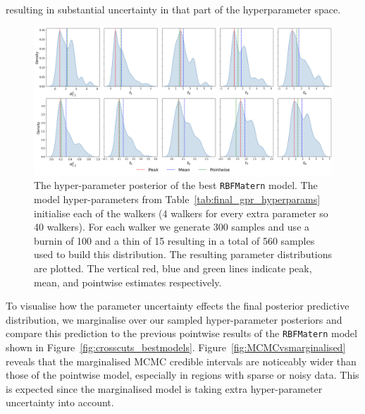 \documentclass{ucdgradtaughtthesis}
\begin{document}
resulting in substantial uncertainty in that part of the hyperparameter space.
\begin{figure}[H]
    \centering
    \includegraphics[width=1\textwidth]{LatexPlots/final_gps_plots/MCMCRBFMat.png}
    \caption[The hyper-parameter posterior of the best \texttt{RBFMatern} model.]{The hyper-parameter posterior of the best \texttt{RBFMatern} model. The model hyper-parameters from Table~\ref{tab:final_gpr_hyperparams} initialise each of the walkers (4 walkers for every extra parameter so 40 walkers). For each walker we generate 300 samples and use a burnin of 100 and a thin of 15 resulting in a total of 560 samples used to build this distribution.
    The resulting parameter distributions are plotted. The vertical red, blue and green lines indicate peak, mean, and pointwise estimates respectively.}
    \label{fig:MCMCRBFMatern}
\end{figure}
To visualise how the parameter uncertainty effects the final posterior predictive distribution, we marginalise over our sampled hyper-parameter posteriors and compare this prediction to the previous pointwise results of the \texttt{RBFMatern} model shown in Figure~\ref{fig:crosscuts_bestmodels}.
Figure~\ref{fig:MCMCvsmarginalised} reveals that the marginalised MCMC credible intervals are noticeably wider than those of the pointwise model, especially in regions with sparse or noisy data. This is expected since the marginalised model is taking extra hyper-parameter
uncertainty into account. 
%
\end{document}
